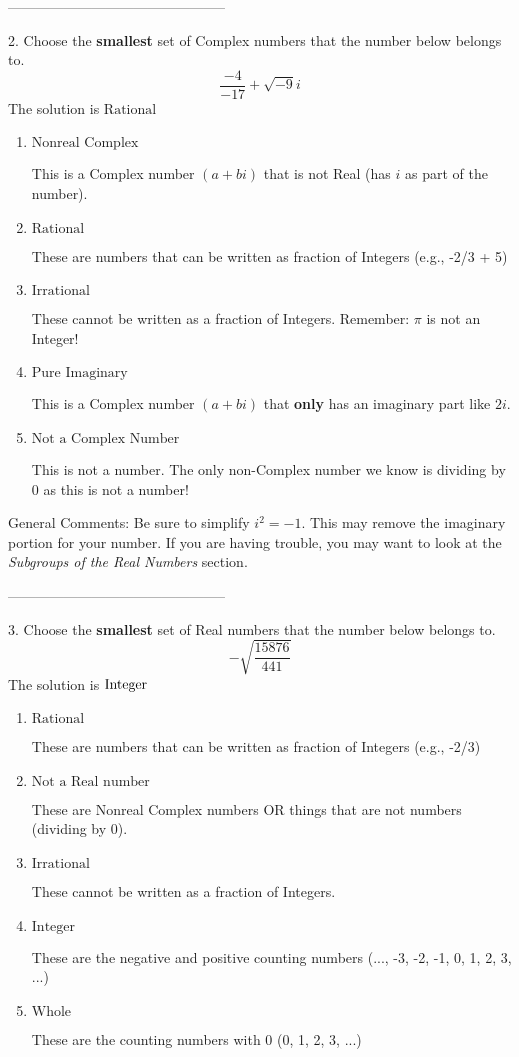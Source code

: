 \documentclass{article}[14pt]
\begin{document}
-----------------------------------------------

2. Choose the \textbf{smallest} set of Complex numbers that the number below belongs to.
$$ \frac{-4}{-17}+\sqrt{-9}i $$ 
The solution is $ \text{Rational} $ 

\begin{enumerate}[label=\Alph*.] 
\item $ \text{Nonreal Complex} $ 

 This is a Complex number $(a+bi)$ that is not Real (has $i$ as part of the number). 
\item $ \text{Rational} $ 

 These are numbers that can be written as fraction of Integers (e.g., -2/3 + 5) 
\item $ \text{Irrational} $ 

 These cannot be written as a fraction of Integers. Remember: $\pi$ is not an Integer! 
\item $ \text{Pure Imaginary} $ 

 This is a Complex number $(a+bi)$ that \textbf{only} has an imaginary part like $2i$. 
\item $ \text{Not a Complex Number} $ 

 This is not a number. The only non-Complex number we know is dividing by 0 as this is not a number! 
\end{enumerate} 
 
General Comments: Be sure to simplify $i^2 = -1$. This may remove the imaginary portion for your number. If you are having trouble, you may want to look at the \textit{Subgroups of the Real Numbers} section.

-----------------------------------------------

3. Choose the \textbf{smallest} set of Real numbers that the number below belongs to.
$$ -\sqrt{\frac{15876}{441}} $$ 
The solution is $ \text{\text{Integer}} $ 

\begin{enumerate}[label=\Alph*.] 
\item $ \text{Rational} $ 

 These are numbers that can be written as fraction of Integers (e.g., -2/3) 
\item $ \text{Not a Real number} $ 

 These are Nonreal Complex numbers OR things that are not numbers (dividing by 0). 
\item $ \text{Irrational} $ 

 These cannot be written as a fraction of Integers. 
\item $ \text{Integer} $ 

 These are the negative and positive counting numbers (..., -3, -2, -1, 0, 1, 2, 3, ...) 
\item $ \text{Whole} $ 

 These are the counting numbers with 0 (0, 1, 2, 3, ...) 
\end{enumerate} 
 
\end{document}
